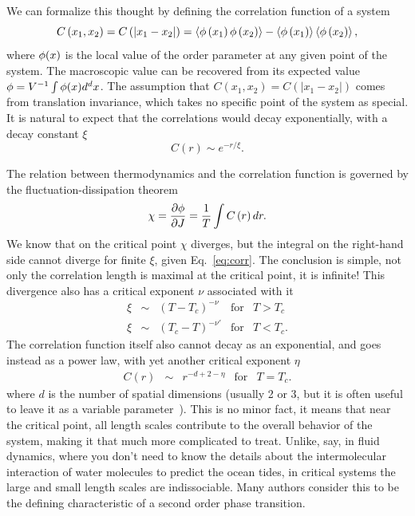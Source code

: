 We can formalize this thought by defining the correlation function of a system
\begin{equation}
    \label{eq:corr}
    C\left(x_{1},x_{2}\right)=
    C\left(\left|x_{1}-x_{2}\right|\right)=
    \left\langle \phi\left(x_{1}\right)\phi\left(x_{2}\right)\right\rangle 
    -\left\langle \phi\left(x_{1}\right)\right\rangle
    \left\langle \phi\left(x_{2}\right)\right\rangle,
\end{equation}
where $\phi(x)$ is the local value of the order parameter at any given point of
the system. The macroscopic value can be recovered from its expected value
$\phi=V^{-1}\int\phi(x)d^d x$. The assumption that
$C\left(x_{1},x_{2}\right)=C\left(\left|x_{1}-x_{2}\right|\right)$ comes from
translation invariance, which takes no specific point of the system as special.
It is natural to expect that the correlations would decay exponentially, with a
decay constant $\xi$
\begin{equation}
    \label{eq:corr}
    C\left(r\right)\sim e^{-r/\xi}.
\end{equation}

The relation between thermodynamics and the correlation function is governed
by the fluctuation-dissipation theorem
\begin{equation}
    \chi=\frac{\partial\phi}{\partial J}=\frac{1}{T}\int C\left(r\right)dr.
\end{equation}
We know that on the critical point $\chi$ diverges, but  the integral on the
right-hand side cannot diverge for finite $\xi$, given Eq.~\ref{eq:corr}.
The conclusion is simple, not only the correlation length is maximal at the
critical point, it is infinite! This divergence also has a critical exponent
$\nu$ associated with it
\begin{equation}
    \label{eq:corlen}
    \begin{array}{ccccc}
        \xi & \sim & {\left(T-T_c\right)}^{-\nu}  & \mbox{for} & T > T_c \\
        \xi & \sim & {\left(T_c-T\right)}^{-\nu'} & \mbox{for} & T < T_c.
    \end{array}
\end{equation}
The correlation function itself also cannot decay as an exponential, and goes
instead as a power law, with yet another critical exponent $\eta$
\begin{equation}
    \label{eq:critcor}
    \begin{array}{ccccc}
        C(r) & \sim & r^{-d+2-\eta} & \mbox{for} & T = T_c.
    \end{array}
\end{equation}
where $d$ is the number of spatial dimensions (usually 2 or 3, but it is often
useful to leave it as a variable parameter~\cite{Wilson1972}). This is no minor
fact, it means that near the critical point, all length scales contribute to
the overall behavior of the system, making it that much more complicated to
treat. Unlike, say, in fluid dynamics, where you don't need to know the details
about the intermolecular interaction of water molecules to predict the ocean
tides, in critical systems the large and small length scales are indissociable.
Many authors consider this to be the defining characteristic of a second order
phase transition.

